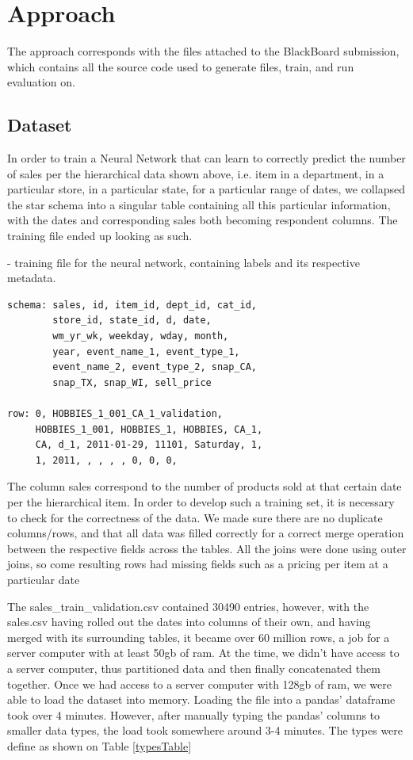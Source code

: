 \documentclass[10pt,twocolumn,letterpaper]{article}
\begin{document}
\section{Approach}
  The approach corresponds with the files attached to the BlackBoard submission,
  which contains all the source code used to generate files, train, and run
  evaluation on.

\subsection{Dataset}
  In order to train a Neural Network that can learn to correctly predict the
  number of sales per the hierarchical data shown above, i.e. item in a
  department, in a particular store, in a particular state, for a particular
  range of dates, we collapsed the star schema into a singular table containing
  all this particular information, with the dates and corresponding sales both
  becoming respondent columns. The training file ended up looking as such.

 - training file for the neural network, containing
labels and its respective metadata.

{\small\begin{verbatim}
schema: sales, id, item_id, dept_id, cat_id,
        store_id, state_id, d, date,
        wm_yr_wk, weekday, wday, month,
        year, event_name_1, event_type_1,
        event_name_2, event_type_2, snap_CA,
        snap_TX, snap_WI, sell_price

row: 0, HOBBIES_1_001_CA_1_validation,
     HOBBIES_1_001, HOBBIES_1, HOBBIES, CA_1,
     CA, d_1, 2011-01-29, 11101, Saturday, 1,
     1, 2011, , , , , 0, 0, 0,
\end{verbatim}}


The column sales correspond to the number of products sold at that certain date
per the hierarchical item. In order to develop such a training set, it is
necessary to check for the correctness of the data. We made sure there are no
duplicate columns/rows, and that all data was filled correctly for a correct
merge operation between the respective fields across the tables. All the joins
were done using outer joins, so come resulting rows had missing fields such as a
pricing per item at a particular date

 The sales\_train\_validation.csv contained 30490 entries, however, with the
sales.csv having rolled out the dates into columns of their own, and having
merged with its surrounding tables, it became over 60 million rows, a job for a
server computer with at least 50gb of ram. At the time, we didn’t have access to
a server computer, thus partitioned data and then finally concatenated them
together. Once we had access to a server computer with 128gb of ram, we were
able to load the dataset into memory. Loading the file into a pandas' dataframe
took over 4 minutes. However, after manually typing the pandas’ columns to
smaller data types, the load took somewhere around 3-4 minutes. The types were
define as shown on Table \ref{typesTable}
\end{document}
